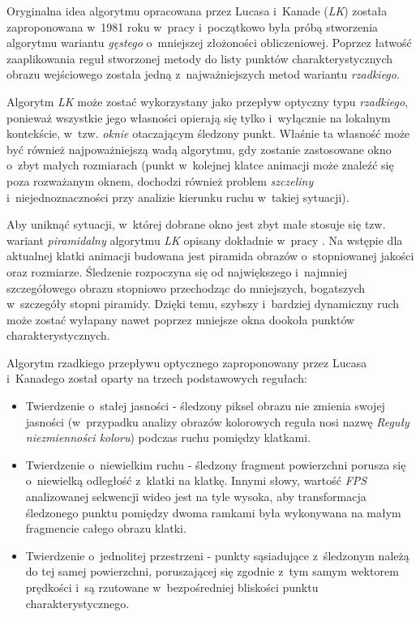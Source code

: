       Oryginalna idea algorytmu opracowana przez Lucasa i~Kanade (\textit{LK}) została zaproponowana w~1981 roku w~pracy \cite{LucasKanadeTracker81} i~początkowo była próbą stworzenia algorytmu wariantu \textit{gęstego} o~mniejszej złożoności obliczeniowej. Poprzez łatwość zaaplikowania reguł stworzonej metody do listy punktów charakterystycznych obrazu wejściowego została jedną z~najważniejszych metod wariantu \textit{rzadkiego}.

      Algorytm \textit{LK} może zostać wykorzystany jako przepływ optyczny typu \textit{rzadkiego}, ponieważ wszystkie jego własności opierają się tylko i~wyłącznie na lokalnym kontekście, w~tzw. \textit{oknie} otaczającym śledzony punkt. Właśnie ta własność może być również najpoważniejszą wadą algorytmu, gdy zostanie zastosowane okno o~zbyt małych rozmiarach (punkt w~kolejnej klatce animacji może znaleźć się poza rozważanym oknem, dochodzi również problem \textit{szczeliny} i~niejednoznaczności przy analizie kierunku ruchu w~takiej sytuacji).

      Aby uniknąć sytuacji, w~której dobrane okno jest zbyt małe stosuje się tzw. wariant \textit{piramidalny} algorytmu \textit{LK} opisany dokładnie w~pracy \cite{OpenCvOpticalFlow04}. Na wstępie dla aktualnej klatki animacji budowana jest piramida obrazów o~stopniowanej jakości oraz rozmiarze. Śledzenie rozpoczyna się od największego i~najmniej szczegółowego obrazu stopniowo przechodząc do mniejszych, bogatszych w~szczegóły stopni piramidy. Dzięki temu, szybszy i~bardziej dynamiczny ruch może zostać wyłapany nawet poprzez mniejsze okna dookoła punktów charakterystycznych.

      Algorytm rzadkiego przepływu optycznego zaproponowany przez Lucasa i~Kanadego został oparty na trzech podstawowych regułach:
        \begin{itemize}
          \item Twierdzenie o~stałej jasności - śledzony piksel obrazu nie zmienia swojej jasności (w~przypadku analizy obrazów kolorowych reguła nosi nazwę \textit{Reguły niezmienności koloru}) podczas ruchu pomiędzy klatkami.
          \item Twierdzenie o~niewielkim ruchu - śledzony fragment powierzchni porusza się o~niewielką odległość z~klatki na klatkę. Innymi słowy, wartość \textit{FPS} analizowanej sekwencji wideo jest na tyle wysoka, aby transformacja śledzonego punktu pomiędzy dwoma ramkami była wykonywana na małym fragmencie całego obrazu klatki.
          \item Twierdzenie o~jednolitej przestrzeni - punkty sąsiadujące z~śledzonym należą do tej samej powierzchni, poruszającej się zgodnie z~tym samym wektorem prędkości i~są rzutowane w~bezpośredniej bliskości punktu charakterystycznego.
        \end{itemize}

